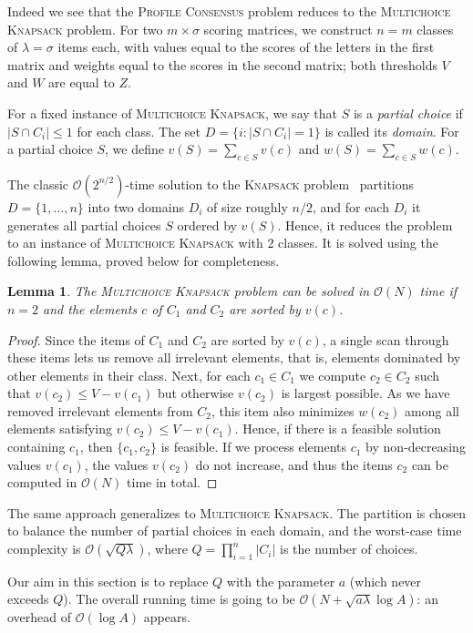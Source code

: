 \documentclass{article}
\theoremstyle{plain}
\newtheorem{lemma}[theorem]{Lemma}
\theoremstyle{definition}
\newcommand{\MK}{\textsc{Multichoice Knapsack}\xspace}
\newcommand{\PC}{\textsc{Profile Consensus}\xspace}
\newcommand{\Knapsack}{\textsc{Knapsack}\xspace}
\newcommand{\Oh}{\mathcal{O}}
\begin{document}
  Indeed we see that the \PC problem reduces to the \MK problem.
  For two $m \times \sigma$ scoring matrices, we construct $n=m$ classes of $\lambda=\sigma$ items each,
  with values equal to the scores of the letters in the first matrix and weights equal to the scores in the second matrix;
  both thresholds $V$ and $W$ are equal to $Z$.
    
    For a fixed instance of \MK, we say that $S$ is a \emph{partial choice} if $|S\cap C_i|\le 1$ for each class.
    The set $D=\{i : |S\cap C_i|=1\}$ is called its \emph{domain}.
    For a partial choice $S$, we define $v(S) = \sum_{c \in S} v(c)$ and $w(S) = \sum_{c \in S} w(c)$.    
    
    
     The classic $\Oh(2^{n/2})$-time solution to the \Knapsack problem~\cite{DBLP:journals/jacm/HorowitzS74}
 partitions $D=\{1,\ldots,n\}$ into two domains $D_i$ of size roughly $n/2$,
 and for each $D_i$ it generates all partial choices $S$ ordered by $v(S)$.
 Hence, it reduces the problem to an instance of \MK with $2$ classes.
 It is solved using the following lemma, proved below for completeness.
  \begin{lemma}\label{lem:knap2}
    The \MK problem can be solved in $\Oh(N)$ time if $n=2$ and
    the elements $c$ of $C_1$ and $C_2$ are sorted by $v(c)$.
  \end{lemma}
    \begin{proof}
      Since the items of $C_1$ and $C_2$ are sorted by $v(c)$, 
      a single scan through these items lets us remove all irrelevant elements, that is, elements dominated by other elements in their class.
      Next, for each $c_1\in C_1$ we compute $c_2\in C_2$ such that $v(c_2)\le V-v(c_1)$ but otherwise $v(c_2)$ is largest possible.
      As we have removed irrelevant elements from $C_2$, this item also minimizes $w(c_2)$ among all elements satisfying $v(c_2)\le V-v(c_1)$.
      Hence, if there is a feasible solution containing $c_1$, then $\{c_1,c_2\}$ is feasible. 
      If we process elements $c_1$ by non-decreasing values $v(c_1)$, the values $v(c_2)$ do not increase, and
      thus the items $c_2$ can be computed in $\Oh(N)$ time in total.
    \end{proof} 

  The same approach generalizes to \MK. 
  The partition is chosen to balance the number of partial choices
  in each domain, and the worst-case time complexity is $\Oh(\sqrt{Q\lambda})$, where $Q=\prod_{i=1}^n |C_i|$ is the number of choices.
  
  Our aim in this section is to replace $Q$ with the parameter $a$ (which never exceeds $Q$).
  The overall running time is going to be  $\Oh(N+\sqrt{a\lambda}\log A)$: an overhead  of $\Oh(\log A)$ appears.
\end{document}

